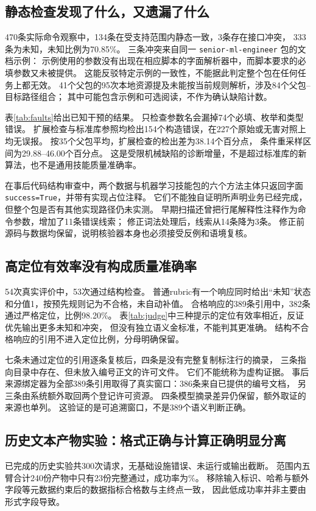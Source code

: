 \subsection{静态检查发现了什么，又遗漏了什么}
470条实际命令观察中，134条在受支持范围内静态一致，3条存在接口冲突，
333条为未知，未知比例为70.85\%。
三条冲突来自同一 \texttt{senior-ml-engineer} 包的文档示例：
示例使用的参数没有出现在相应脚本的字面解析器中，而脚本要求的必填参数又未被提供。
这能反驳特定示例的一致性，不能据此判定整个包在任何任务上都无效。
41个父包的95次本地资源提及未能按当前规则解析，涉及84个父包--目标路径组合；
其中可能包含示例和可选阅读，不作为确认缺陷计数。


表\ref{tab:faults}给出已知干预的结果。
只检查参数名会漏掉74个必填、枚举和类型错误。
扩展检查与标准库参照均检出154个构造错误，在227个原始或无害对照上均无误报。
按35个父包平均，扩展检查的检出差为38.14个百分点，
条件重采样区间为29.88--46.00个百分点。
这是受限机械缺陷的诊断增量，不是超过标准库的新算法，也不是通用技能质量准确率。

在事后代码结构审查中，两个数据与机器学习技能包的六个方法主体只返回字面
\texttt{success=True}，并带有实现占位注释。
它们不能独自证明所声明业务已经完成，但整个包是否有其他实现路径仍未实测。
早期扫描还曾把行尾解释性注释作为命令参数，增加了11条错误线索；
修正词法处理后，线索从14条降为3条。
修正前源码与数据均保留，说明核验器本身也必须接受反例和语境复核。

\subsection{高定位有效率没有构成质量准确率}

54次真实评价中，53次通过结构检查。
普通rubric有一个响应同时给出“未知”状态和分值1，按预先规则记为不合格，未自动补值。
合格响应的389条引用中，382条通过严格定位，比例98.20\%。
表\ref{tab:judge}中三种提示的定位有效率相近，反证优先输出更多未知和冲突，
但没有独立语义金标准，不能判其更准确。
结构不合格响应的引用不进入定位比例，分母明确保留。

七条未通过定位的引用逐条复核后，四条是没有完整复制标注行的摘录，
三条指向目录中存在、但未放入编号正文的许可文件。
它们不能统称为虚构证据。
事后来源绑定器为全部389条引用取得了真实窗口：386条来自已提供的编号文档，
另三条由系统额外取回两个登记许可资源。
四条模型摘录差异仍保留，额外取证的来源也单列。
这验证的是可追溯窗口，不是389个语义判断正确。

\subsection{历史文本产物实验：格式正确与计算正确明显分离}

已完成的历史实验共300次请求，无基础设施错误、未运行或输出截断。
范围内五臂合计240份产物中只有23份完整通过，成功率为\NormalPassRate\%。
移除输入标识、哈希与额外字段等元数据约束后的数据指标合格数与主终点一致，
因此低成功率并非主要由形式字段导致。

